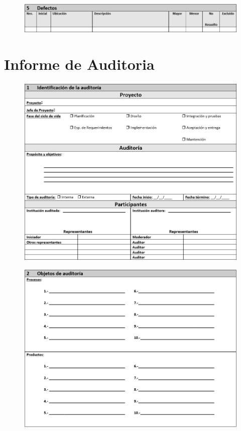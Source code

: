 \begin{figure}[H]
\centering
\includegraphics[width=1\textwidth]{figures/anexos/1-5.PNG}
\end{figure}

\section{Informe de Auditoria}

\begin{figure}[H]
\centering
\includegraphics[width=1\textwidth]{figures/anexos/2-1.PNG}
\end{figure}

\begin{figure}[H]
\centering
\includegraphics[width=1\textwidth]{figures/anexos/2-2.PNG}
\end{figure}

